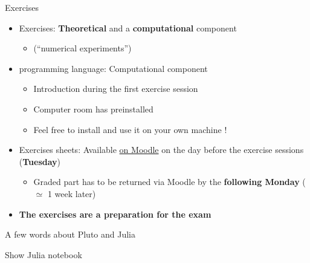 \begin{frame}{Exercises}
    \begin{itemize}
        \item Exercises: \textbf{Theoretical}
            and a \textbf{computational} component
            \begin{itemize}
                \vspace{-0.3em}
                \item \textcolor{grey5}{(``numerical experiments'')}
            \end{itemize}
        \vspace{0.5em}
        \item \julia programming language: Computational component
            \begin{itemize}
                \vspace{-0.2em}
                \item Introduction during the first exercise session
                \vspace{-0.2em}
                \item Computer room has \julia preinstalled
                \vspace{-0.2em}
                \item Feel free to install and use it on your own machine !
            \end{itemize}
        \vspace{1em}
        \item Exercises sheets: Available
            \alert{\href{https://go.epfl.ch/numerical-analysis}{on Moodle}}
            on the day before the exercise sessions (\textbf{Tuesday})
            \begin{itemize}
                \item \alert{Graded part} has to be returned \alert{via Moodle}
            by the \textbf{following Monday}
            ($\simeq$ 1 week later)
            \end{itemize}
        \vspace{1em}
        \item \textbf{The exercises are a preparation for the exam}
    \end{itemize}
\end{frame}

\begin{frame}{A few words about Pluto and Julia}
    \begin{center}
        \Large{Show Julia notebook}
    \end{center}
\end{frame}


